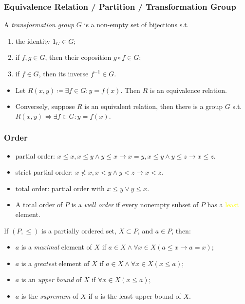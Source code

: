 \documentclass[UTF8,aspectratio=43,11pt,colorlinks,compress,openany]{beamer}%
\begin{document}
\begin{frame}\frametitle{Equivalence Relation / Partition / Transformation Group}
\begin{definition}
A \emph{transformation group} $G$ is a non-empty set of bijections s.t.
\begin{enumerate}
	\item the identity $1_G\in G$;
	\item if $f,g\in G$, then their coposition $g\circ f\in G$;
	\item if $f\in G$, then its inverse $f^{-1}\in G$.
\end{enumerate}
\end{definition}
\begin{itemize}
	\item Let $R(x,y)\coloneqq \exists f\in G: y=f(x)$. Then $R$ is an equivalence relation.
	\item Conversely, suppose $R$ is an equivalent relation, then there is a group $G$ s.t. $R(x,y)\iff \exists f\in G: y=f(x)$.
\end{itemize}
\end{frame}

\begin{frame}\frametitle{Order}
	\begin{itemize}
		\item partial order: $x\leq x, x\leq y\wedge y\leq x\to x=y, x\leq y\wedge y\leq z\to x\leq z$.
		\item strict partial order: $x\not< x, x< y\wedge y<z\to x<z$.
		\item total order: partial order with $x\leq y\vee y\leq x$.
		\item A total order of $P$ is a \emph{well order} if every nonempty subset of $P$ has a \textcolor{yellow}{least} element.
	\end{itemize}
	\begin{definition}
		If $(P,\leq)$ is a partially ordered set, $X\subset P$, and $a\in P$, then:
		\begin{itemize}
			\item $a$ is a \emph{maximal} element of $X$ if $a\in X\wedge\forall x\in X(a\leq x\to a=x)$;
			\item $a$ is a \emph{greatest} element of $X$ if $a\in X\wedge\forall x\in X(x\leq a)$;
			\item $a$ is an \emph{upper bound} of $X$ if $\forall x\in X(x\leq a)$;
			\item $a$ is the \emph{supremum} of $X$ if $a$ is the least upper bound of $X$.
		\end{itemize}
	\end{definition}
\end{frame}
\end{document}
